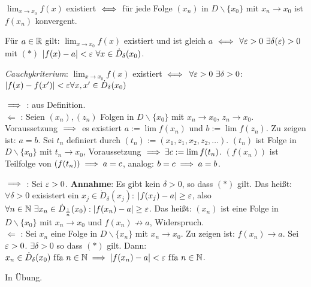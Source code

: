 \documentclass[a4paper,twoside,DIV15,BCOR12mm]{scrbook}
\begin{document}
\begin{satz}
\begin{liste}
\item $\displaystyle\lim_{x\to x_0}f(x)$ existiert $\iff$ für jede Folge $(x_n)$ in $D\backslash\{x_0\}$ mit $x_n \to x_0$ ist $f(x_n)$ konvergent.
\item Für $a\in\mathbb{R}$ gilt: $\displaystyle\lim_{x\to x_0}f(x)$ existiert und ist gleich $a$ $\iff$ $\forall \varepsilon>0 \ \exists \delta(\varepsilon) > 0$ mit $(*)$ $|f(x) - a|< \varepsilon \ \forall x \in \dot D_\delta(x_0)$. 
\item \textit{Cauchykriterium}: $\displaystyle\lim_{x\to x_0} f(x)$ existiert $\iff$ $\forall \varepsilon>0 \ \exists \delta >0$: $|f(x) - f(x')|<\varepsilon \forall x,x' \in \dot D_\delta(x_0)$
\end{liste}
\end{satz}

\begin{beweise}
\item \glqq $\implies$ \grqq: aus Definition. \\
\glqq $\Leftarrow$ \grqq: Seien $(x_n), (z_n)$ Folgen in $D\backslash\{x_0\}$ mit $x_n \to x_0$, $z_n \to x_0$. Voraussetzung $\implies$ es existiert $a := \lim f(x_n)$ und $b := \lim f(z_n)$. Zu zeigen ist: $a=b$. Sei $t_n$ definiert durch $(t_n) := (x_1,z_1,x_2,z_2,\ldots)$. $(t_n)$ ist Folge in $D \backslash\{x_0\}$ mit $t_n\to x_0$, Voraussetzung $\implies  \exists c := \lim f(t_n)$. $(f(x_n))$ ist Teilfolge von $(f(t_n)) \implies a=c$, analog: $b=c \implies a = b$.
\item \glqq $\implies$ \grqq: Sei $\varepsilon > 0$. \textbf{Annahme}: Es gibt kein $\delta > 0$, so dass $(*)$ gilt. Das heißt: $\forall \delta > 0$ exisistert ein $x_j \in \dot D_\delta(x_j)$: $|f(x_j) - a| \ge \varepsilon$, also $\forall n\in\mathbb{N} \ \exists x_n \in \dot D_{\frac{1}{n}}(x_0): |f(x_n) - a|\ge\varepsilon$. Das heißt: $(x_n)$ ist eine Folge in $D \backslash\{x_0\}$ mit $x_n \to x_0$ und $f(x_n) \nrightarrow a$, Widerspruch. \\
\glqq $\Leftarrow$ \grqq: Sei $x_n$ eine Folge in $D \backslash\{x_n\}$ mit $x_n \to x_0$. Zu zeigen ist: $f(x_n) \to a$. Sei $\varepsilon>0$. $\exists \delta > 0$ so dass $(*)$ gilt. Dann: $x_n \in \dot D_\delta(x_0) \text{ f\/fa } n\in\mathbb{N} \implies |f(x_n) - a| < \varepsilon \text{ f\/fa } n\in\mathbb{N}$.
\item In Übung.
\end{beweise}
\end{document}
